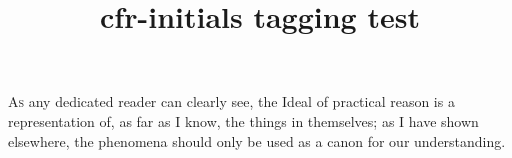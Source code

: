 \documentclass{article}
\title{cfr-initials tagging test}
\begin{document}
\renewcommand\LettrineFontHook{\Acornfamily}%
\lettrine{A}{s} any dedicated reader can clearly see, the Ideal of practical reason is a representation of, as far as I know, the things in themselves; as I have shown elsewhere, the phenomena should only be
used as a canon for our understanding.

\end{document}
